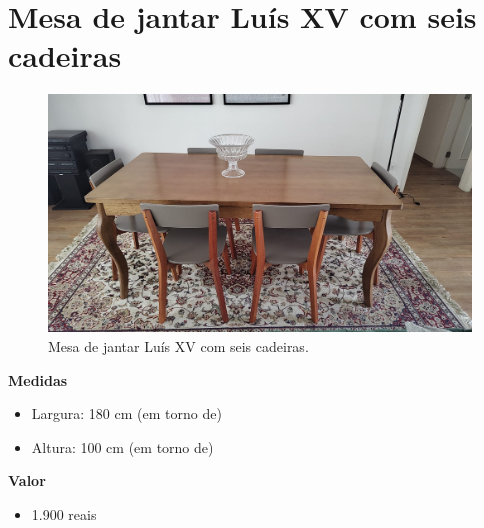 




\begingroup\thispagestyle{empty}\vspace*{.05\textheight} 


\section {Mesa de jantar Luís XV com seis cadeiras}

\begin{figure}[htpb!]
\includegraphics[width=\textwidth]{./MEDIA/MESA_JANTAR.jpeg}
\caption{Mesa de jantar Luís XV com seis cadeiras.}
\end{figure}

\textbf{Medidas}
\begin{itemize}
\item Largura: 180 cm (em torno de)
\item Altura: 100 cm (em torno de)
\end{itemize}

\textbf{Valor}
\begin{itemize}
\item 1.900 reais
\end{itemize}
                    
\endgroup
\vfill
\pagebreak
